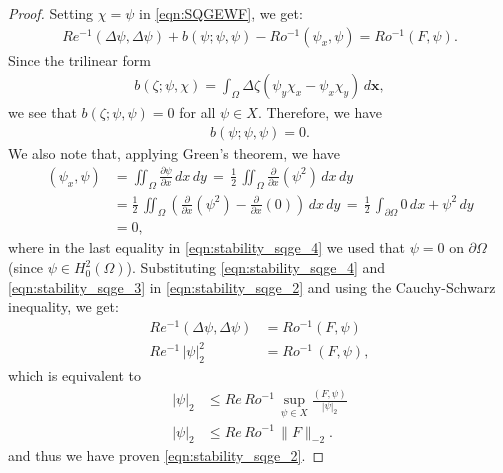 \begin{proof}
Setting $\chi = \psi$ in \eqref{eqn:SQGEWF}, we get:
\begin{align}
  Re^{-1} (\Delta \psi, \Delta \psi) + b(\psi;\psi, \psi) - Ro^{-1}(\psi_x, \psi)
    = Ro^{-1} (F,\psi) .
\label{eqn:stability_sqge_2}
\end{align}
Since the trilinear form
\begin{align*}
  b(\zeta; \psi, \chi) = \int_{\Omega}\! \Delta \zeta \left(\psi_y \chi_x -
  \psi_x \chi_y\right)\, d\mathbf{x},
\end{align*}
we see that $b(\zeta; \psi, \psi) = 0$ for all $\psi \in X$. Therefore, we have
\begin{align}
  b(\psi;\psi, \psi) = 0 .
  \label{eqn:stability_sqge_3}
\end{align}
We also note that, applying Green's theorem, we have
\begin{align}
  (\psi_x,\psi) &= \iint_{\Omega} \frac{\partial \psi}{\partial x} \, dx \, dy
    \, = \, \frac{1}{2} \, \iint_{\Omega} \frac{\partial}{\partial x} (\psi^2) \, dx \, dy \nonumber \\
  &= \frac{1}{2} \, \iint_{\Omega} \left( \frac{\partial}{\partial x} (\psi^2)
    - \frac{\partial}{\partial x} (0) \right) \, dx \, dy
    \, = \,  \frac{1}{2} \, \int_{\partial \Omega} 0 \, dx + \psi^2 \, dy \nonumber \\
  &= 0 ,
\label{eqn:stability_sqge_4}
\end{align}
where in the last equality in \eqref{eqn:stability_sqge_4} we used that $\psi =
0$ on $\partial \Omega$ (since $\psi \in H_0^2(\Omega)$).  Substituting
\eqref{eqn:stability_sqge_4} and \eqref{eqn:stability_sqge_3} in
\eqref{eqn:stability_sqge_2} and using the Cauchy-Schwarz inequality, we get:
\begin{align}
  Re^{-1} (\Delta \psi, \Delta \psi) &= Ro^{-1} (F,\psi) \nonumber \\
  Re^{-1}\, |\psi|_2^2 &= Ro^{-1}\, (F,\psi),
\end{align}
which is equivalent to
\begin{align}
  |\psi|_2 &\le Re\, Ro^{-1}\,\sup_{\psi \in X} \frac{(F,\psi)}{|\psi|_2} \nonumber \\
  |\psi|_2 &\le Re\, Ro^{-1}\, \|F\|_{-2}.
  \label{eqn:stability_sqge_5}
\end{align}
and thus we have proven \eqref{eqn:stability_sqge_2}.
\end{proof}
